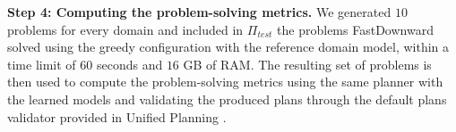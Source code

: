 \documentclass[letterpaper]{article} %
\newcommand{\T}{T}
\newcommand{\Ttrain}{\T_{\textit{train}}}
\newcommand{\Ttest}{\T_{\textit{test}}}
\newcommand{\miniparagraph}[1]{\textbf{#1.}}
\newcommand{\stest}{\ensuremath{S_{\textit{test}}}\xspace}
\newcommand{\ptest}{\ensuremath{\Pi_{\textit{test}}}\xspace}
\newif\ifaddcomments
\newcommand{\roni}[1]{\ifaddcomments{\textcolor{red}{[Roni: #1]}}\fi}
\newcommand{\leo}[1]{\ifaddcomments{\textcolor{pink}{[Leonardo: #1]}}\fi}
\begin{document}


%
\miniparagraph{Step 4: Computing the problem-solving metrics}
We generated $10$ problems for every domain and included in $\ptest$ the problems FastDownward solved using the greedy configuration with the reference domain model, within a time limit of $60$ seconds and $16$ GB of RAM. 
The resulting set of problems is then used to compute the problem-solving metrics using the same planner with the learned models and validating the produced plans through the default plans validator provided in Unified Planning \cite{unified_planning_softwarex2025} . 



\end{document}
